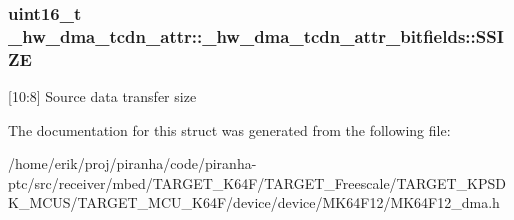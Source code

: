 \subsubsection[{\texorpdfstring{S\+S\+I\+ZE}{SSIZE}}]{\setlength{\rightskip}{0pt plus 5cm}uint16\+\_\+t \+\_\+hw\+\_\+dma\+\_\+tcdn\+\_\+attr\+::\+\_\+hw\+\_\+dma\+\_\+tcdn\+\_\+attr\+\_\+bitfields\+::\+S\+S\+I\+ZE}\hypertarget{struct__hw__dma__tcdn__attr_1_1__hw__dma__tcdn__attr__bitfields_ae2865466d5cf5fbc08d39693e5db1020}{}\label{struct__hw__dma__tcdn__attr_1_1__hw__dma__tcdn__attr__bitfields_ae2865466d5cf5fbc08d39693e5db1020}
\mbox{[}10\+:8\mbox{]} Source data transfer size 

The documentation for this struct was generated from the following file\+:\begin{DoxyCompactItemize}
\item 
/home/erik/proj/piranha/code/piranha-\/ptc/src/receiver/mbed/\+T\+A\+R\+G\+E\+T\+\_\+\+K64\+F/\+T\+A\+R\+G\+E\+T\+\_\+\+Freescale/\+T\+A\+R\+G\+E\+T\+\_\+\+K\+P\+S\+D\+K\+\_\+\+M\+C\+U\+S/\+T\+A\+R\+G\+E\+T\+\_\+\+M\+C\+U\+\_\+\+K64\+F/device/device/\+M\+K64\+F12/M\+K64\+F12\+\_\+dma.\+h\end{DoxyCompactItemize}
